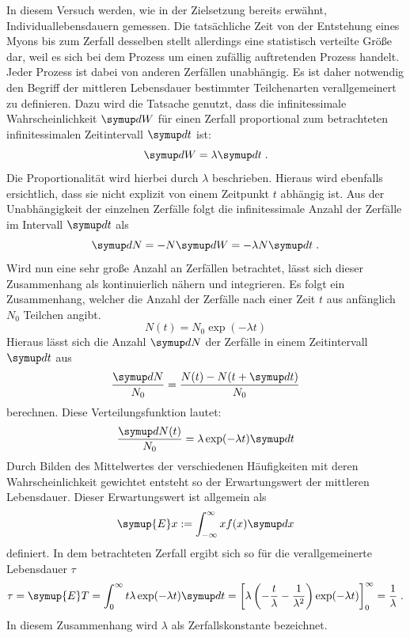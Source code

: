 In diesem Versuch werden, wie in der Zielsetzung bereits erwähnt, Individuallebensdauern gemessen. Die tatsächliche Zeit
von der Entstehung eines Myons bis zum Zerfall desselben stellt allerdings eine statistisch verteilte Größe dar, weil es
sich bei dem Prozess um einen zufällig auftretenden Prozess handelt. Jeder Prozess ist dabei von anderen Zerfällen
unabhängig. Es ist daher notwendig den Begriff der mittleren Lebensdauer bestimmter Teilchenarten verallgemeinert zu definieren.
Dazu wird die Tatsache genutzt, dass die infinitessimale Wahrscheinlichkeit $\upd W$ für einen Zerfall proportional zum
betrachteten infinitessimalen Zeitintervall $\upd t$ ist:
%
\begin{equation}
  \upd W=\lambda\upd t \; .
\end{equation}
%
Die Proportionalität wird hierbei durch $\lambda$ beschrieben. Hieraus wird ebenfalls ersichtlich, dass sie nicht explizit von einem Zeitpunkt $t$ abhängig ist. Aus der Unabhängigkeit
der einzelnen Zerfälle folgt die infinitessimale Anzahl der Zerfälle im Intervall $\upd t$ als
%
\begin{equation}
  \upd N=-N\upd W=-\lambda N\upd t \; .
\end{equation}
%
Wird nun eine sehr große Anzahl an Zerfällen betrachtet, lässt sich dieser Zusammenhang als kontinuierlich nähern und
integrieren. Es folgt ein Zusammenhang, welcher die Anzahl der Zerfälle nach einer Zeit $t$ aus anfänglich $N_0$
Teilchen angibt.
%
\begin{equation}
  N(t)=N_0\exp(-\lambda t)
\end{equation}
%
Hieraus lässt sich die Anzahl $\upd N$ der Zerfälle in einem Zeitintervall $\upd t$ aus
%
\begin{equation}
  \frac{\upd N}{N_0}=\frac{N(t)-N(t+\upd t)}{N_0}
\end{equation}
%
berechnen. Diese Verteilungsfunktion lautet:
%
\begin{equation}
  \frac{\upd N(t)}{N_0}=\lambda\exp(-\lambda t)\upd t
\end{equation}
%
Durch Bilden des Mittelwertes der verschiedenen Häufigkeiten mit deren Wahrscheinlichkeit gewichtet entsteht so der
Erwartungswert der mittleren Lebensdauer. Dieser Erwartungswert ist allgemein als
%
\begin{equation}
  \symup{E}x:=\int_{-\infty}^{\infty}xf(x)\upd x
\end{equation}
%
definiert. In dem betrachteten Zerfall ergibt sich so für die verallgemeinerte Lebensdauer $\tau$
%
\begin{equation}
  \tau=\symup{E}T=\int_0^\infty t\lambda\exp(-\lambda t)\upd t=\left[\lambda\left(-\frac{t}{\lambda}-\frac{1}{\lambda^2}\right)\exp(-\lambda t)\right]^\infty_0=\frac{1}{\lambda} \; .
\end{equation}
%
In diesem Zusammenhang wird $\lambda$ als Zerfallskonstante bezeichnet.
